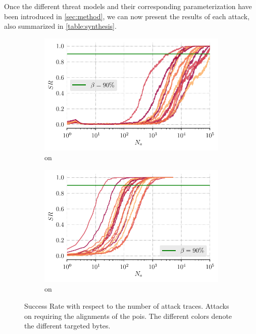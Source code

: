 Once the different threat models and their corresponding parameterization have been introduced in \autoref{sec:method}, we can now present the results of each attack, 
also summarized in \autoref{table:synthesis}.

\begin{figure}[t]
	\begin{subfigure}{0.49 \textwidth}
		\centering
		\includegraphics[width=\textwidth]{Figures/metrics/v1/succ_rate_cpa}
		\caption{\attCPASync{} on \mbedTLS{}}
		\label{fig:v1_sr_cpa}
	\end{subfigure}
	\begin{subfigure}{0.49 \textwidth}
		\centering
		\includegraphics[width=\textwidth]{Figures/metrics/v1/succ_rate_lda}
		\caption{\attLDASync{} on \mbedTLS{}}
		\label{fig:v1_sr_lda}
	\end{subfigure}
	\caption{Success Rate with respect to the number of attack traces.
	Attacks on \mbedTLS{} requiring the alignments of the \glspl{poi}.
	The different colors denote the different targeted bytes.}
	\label{fig:a1_a2_mbed}
\end{figure}

